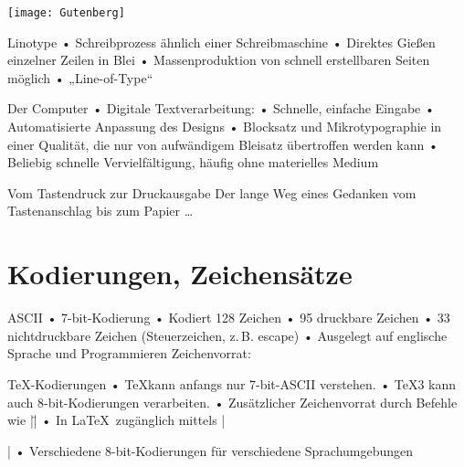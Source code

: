 {
\begin{frame}[plain]
\vspace*{-.5em}
\centerline{\texttt{[image: Gutenberg]}}
\end{frame}}

\begin{frame}{Linotype}
• Schreibprozess ähnlich einer Schreibmaschine
• Direktes Gießen einzelner Zeilen in Blei
• Massenproduktion von schnell erstellbaren Seiten möglich
• „Line-of-Type“
\• 
\end{frame}

\begin{frame}{Der Computer}
• Digitale Textverarbeitung:
• Schnelle, einfache Eingabe
• Automatisierte Anpassung des Designs
• Blocksatz und Mikrotypographie in einer Qualität, die nur von aufwändigem Bleisatz übertroffen werden kann
• Beliebig schnelle Vervielfältigung, häufig ohne materielles Medium
\•
\end{frame}

\begin{frame}{Vom Tastendruck zur Druckausgabe}
Der lange Weg eines Gedanken vom Tastenanschlag bis zum Papier …
\end{frame}


\section{Kodierungen, Zeichensätze}
\begin{frame}[fragile]{ASCII}
• 7-bit-Kodierung
• Kodiert 128 Zeichen
• 95 druckbare Zeichen
• 33 nichtdruckbare Zeichen (Steuerzeichen, z.\,B. escape)
• Ausgelegt auf englische Sprache und Programmieren
\• 
Zeichenvorrat:
\begin{verbatim*}
 !"#$%&'()*+,-./0123456789:;<=>?
@ABCDEFGHIJKLMNOPQRSTUVWXYZ[\]^_
`abcdefghijklmnopqrstuvwxyz{|}~ 
\end{verbatim*}
\end{frame}

\begin{frame}[fragile]{\TeX-Kodierungen}
• \TeX kann anfangs nur 7-bit-ASCII verstehen.
• \TeX3 kann auch 8-bit-Kodierungen verarbeiten.
• Zusätzlicher Zeichenvorrat durch Befehle wie |\"|
• In \LaTeX\ zugänglich mittels |\usepackage[kodierung]{inputenc}|
• Verschiedene 8-bit-Kodierungen für verschiedene Sprachumgebungen
\•
\end{frame}

